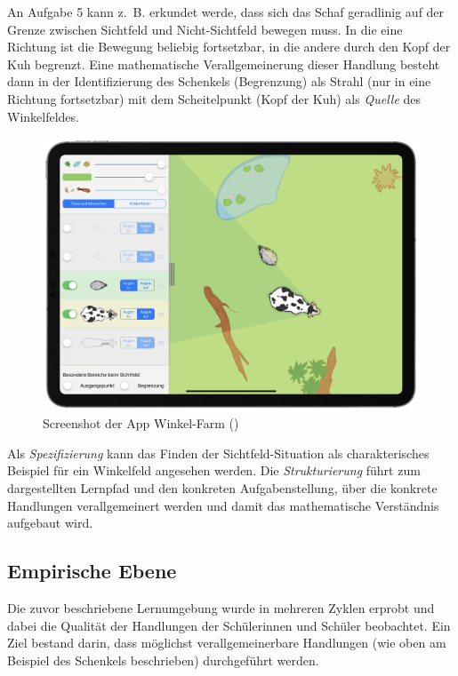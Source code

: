 \documentclass[
]{scrbook}
\theoremstyle{definition}
\theoremstyle{definition}
\theoremstyle{definition}
\theoremstyle{definition}
\theoremstyle{remark}
\begin{document}
An Aufgabe 5 kann z.~B. erkundet werde, dass sich das Schaf geradlinig auf der Grenze zwischen Sichtfeld und Nicht-Sichtfeld bewegen muss. In die eine Richtung ist die Bewegung beliebig fortsetzbar, in die andere durch den Kopf der Kuh begrenzt. Eine mathematische Verallgemeinerung dieser Handlung besteht dann in der Identifizierung des Schenkels (Begrenzung) als Strahl (nur in eine Richtung fortsetzbar) mit dem Scheitelpunkt (Kopf der Kuh) als \emph{Quelle} des Winkelfeldes.



\begin{figure}

{\centering \includegraphics[width=0.75\linewidth]{pictures/1-Winkelfarm} 

}

\caption{Screenshot der App Winkel-Farm ()}\label{fig:WinkelfarmApp}
\end{figure}

Als \emph{Spezifizierung} kann das Finden der Sichtfeld-Situation als charakterisches Beispiel für ein Winkelfeld angesehen werden. Die \emph{Strukturierung} führt zum dargestellten Lernpfad und den konkreten Aufgabenstellung, über die konkrete Handlungen verallgemeinert werden und damit das mathematische Verständnis aufgebaut wird.

\subsection{Empirische Ebene}\label{empirische-ebene}

Die zuvor beschriebene Lernumgebung wurde in mehreren Zyklen erprobt und dabei die Qualität der Handlungen der Schülerinnen und Schüler beobachtet. Ein Ziel bestand darin, dass möglichst verallgemeinerbare Handlungen (wie oben am Beispiel des Schenkels beschrieben) durchgeführt werden.
\end{document}
